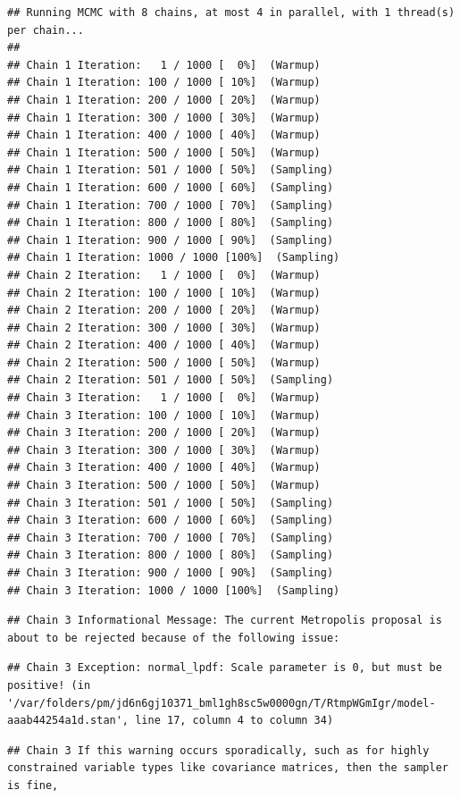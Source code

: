 \documentclass[
]{book}
\begin{document}
\begin{verbatim}
## Running MCMC with 8 chains, at most 4 in parallel, with 1 thread(s) per chain...
## 
## Chain 1 Iteration:   1 / 1000 [  0%]  (Warmup) 
## Chain 1 Iteration: 100 / 1000 [ 10%]  (Warmup) 
## Chain 1 Iteration: 200 / 1000 [ 20%]  (Warmup) 
## Chain 1 Iteration: 300 / 1000 [ 30%]  (Warmup) 
## Chain 1 Iteration: 400 / 1000 [ 40%]  (Warmup) 
## Chain 1 Iteration: 500 / 1000 [ 50%]  (Warmup) 
## Chain 1 Iteration: 501 / 1000 [ 50%]  (Sampling) 
## Chain 1 Iteration: 600 / 1000 [ 60%]  (Sampling) 
## Chain 1 Iteration: 700 / 1000 [ 70%]  (Sampling) 
## Chain 1 Iteration: 800 / 1000 [ 80%]  (Sampling) 
## Chain 1 Iteration: 900 / 1000 [ 90%]  (Sampling) 
## Chain 1 Iteration: 1000 / 1000 [100%]  (Sampling) 
## Chain 2 Iteration:   1 / 1000 [  0%]  (Warmup) 
## Chain 2 Iteration: 100 / 1000 [ 10%]  (Warmup) 
## Chain 2 Iteration: 200 / 1000 [ 20%]  (Warmup) 
## Chain 2 Iteration: 300 / 1000 [ 30%]  (Warmup) 
## Chain 2 Iteration: 400 / 1000 [ 40%]  (Warmup) 
## Chain 2 Iteration: 500 / 1000 [ 50%]  (Warmup) 
## Chain 2 Iteration: 501 / 1000 [ 50%]  (Sampling) 
## Chain 3 Iteration:   1 / 1000 [  0%]  (Warmup) 
## Chain 3 Iteration: 100 / 1000 [ 10%]  (Warmup) 
## Chain 3 Iteration: 200 / 1000 [ 20%]  (Warmup) 
## Chain 3 Iteration: 300 / 1000 [ 30%]  (Warmup) 
## Chain 3 Iteration: 400 / 1000 [ 40%]  (Warmup) 
## Chain 3 Iteration: 500 / 1000 [ 50%]  (Warmup) 
## Chain 3 Iteration: 501 / 1000 [ 50%]  (Sampling) 
## Chain 3 Iteration: 600 / 1000 [ 60%]  (Sampling) 
## Chain 3 Iteration: 700 / 1000 [ 70%]  (Sampling) 
## Chain 3 Iteration: 800 / 1000 [ 80%]  (Sampling) 
## Chain 3 Iteration: 900 / 1000 [ 90%]  (Sampling) 
## Chain 3 Iteration: 1000 / 1000 [100%]  (Sampling)
\end{verbatim}

\begin{verbatim}
## Chain 3 Informational Message: The current Metropolis proposal is about to be rejected because of the following issue:
\end{verbatim}

\begin{verbatim}
## Chain 3 Exception: normal_lpdf: Scale parameter is 0, but must be positive! (in '/var/folders/pm/jd6n6gj10371_bml1gh8sc5w0000gn/T/RtmpWGmIgr/model-aaab44254a1d.stan', line 17, column 4 to column 34)
\end{verbatim}

\begin{verbatim}
## Chain 3 If this warning occurs sporadically, such as for highly constrained variable types like covariance matrices, then the sampler is fine,
\end{verbatim}
\end{document}
